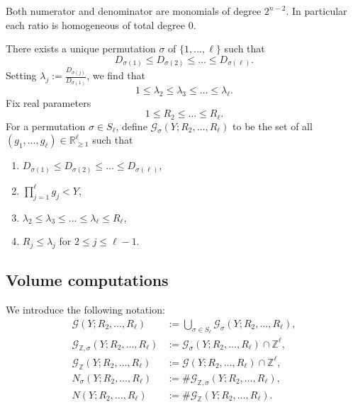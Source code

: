 \documentclass{amsart}
\theoremstyle{plain}
\theoremstyle{definition}
\theoremstyle{remark}
\numberwithin{equation}{section}
\begin{document}
Both numerator and denominator are monomials of degree $2^{n-2}$.
In particular each ratio is homogeneous of total degree $0$. 
\par There exists a unique permutation $\sigma$ of $\{1,\dots,\ell\}$
such that
\[
D_{\sigma(1)}
\leq 
D_{\sigma(2)}
\leq 
\dots
\leq 
D_{\sigma(\ell)}.
\]
Setting $\lambda_j:=\frac{D_{\sigma(j)}}{D_{\sigma(1)}}$, we find that 
\[1\leq \lambda_2\leq \lambda_3\leq \dots \leq \lambda_\ell.\]Fix real parameters
\[
1\le R_2\le \dots\le R_\ell.
\]
For a permutation $\sigma\in S_\ell$,
define $\mathcal G_\sigma(Y;R_2,\dots,R_\ell)$
to be the set of all $(g_1,\dots,g_\ell)\in\mathbb R_{\ge1}^\ell$ such that
\begin{enumerate}
\item $D_{\sigma(1)}
\leq 
D_{\sigma(2)}
\leq 
\dots
\leq 
D_{\sigma(\ell)}$,
\item $\displaystyle \prod_{j=1}^{\ell} g_j < Y$,
\item $\lambda_2\leq \lambda_3\leq \dots \leq \lambda_\ell\le R_\ell$,
\item $R_j\le \lambda_{j}$ for $2\le j\le \ell-1$.
\end{enumerate}

\subsection{Volume computations}
We introduce the following notation:
\begin{equation}\label{notation of G etc}
\begin{aligned}
\mathcal G(Y;R_2,\dots,R_\ell)
&:=
\bigcup_{\sigma\in S_{\ell}}
\mathcal G_\sigma(Y;R_2,\dots,R_\ell), \\
\mathcal G_{\mathbb Z,\sigma}(Y;R_2,\dots,R_\ell)
&:=
\mathcal G_\sigma(Y;R_2,\dots,R_\ell)\cap \mathbb Z^\ell, \\
\mathcal G_{\mathbb Z}(Y;R_2,\dots,R_\ell)
&:=
\mathcal G(Y;R_2,\dots,R_\ell)\cap \mathbb Z^\ell, \\
N_\sigma(Y;R_2,\dots,R_\ell)
&:=
\#\mathcal G_{\mathbb Z,\sigma}(Y;R_2,\dots,R_\ell), \\
N(Y;R_2,\dots,R_\ell)
&:=
\#\mathcal G_{\mathbb Z}(Y;R_2,\dots,R_\ell).
\end{aligned}
\end{equation}

\medskip
\end{document}
